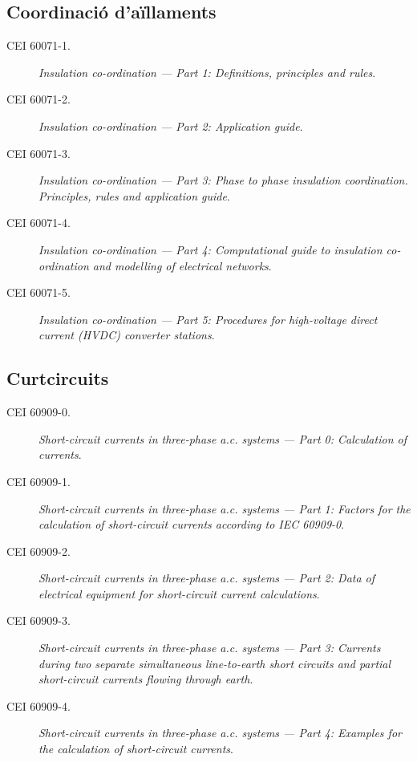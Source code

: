 \subsection*{Coordinació d'aïllaments}
\begin{description}
    \item [\hspace{5mm}CEI 60071-1.] \textit{Insulation co-ordination --- Part 1: Definitions, principles and rules}.
    \item [\hspace{5mm}CEI 60071-2.] \textit{Insulation co-ordination --- Part 2: Application guide}.
    \item [\hspace{5mm}CEI 60071-3.] \textit{Insulation co-ordination --- Part 3: Phase to phase insulation coordination. Principles, rules and application guide}.
    \item [\hspace{5mm}CEI 60071-4.] \textit{Insulation co-ordination --- Part 4: Computational guide to insulation co-ordination and modelling of electrical networks}.
    \item [\hspace{5mm}CEI 60071-5.] \textit{Insulation co-ordination --- Part 5: Procedures for high-voltage direct current (HVDC) converter stations}.
\end{description}


\subsection*{Curtcircuits}
\begin{description}
    \item [\hspace{5mm}CEI 60909-0.] \textit{Short-circuit currents in three-phase a.c. systems --- Part 0: Calculation of currents}.
    \item [\hspace{5mm}CEI 60909-1.] \textit{Short-circuit currents in three-phase a.c. systems --- Part 1:  Factors for the calculation of short-circuit currents according to IEC 60909-0}.
    \item [\hspace{5mm}CEI 60909-2.] \textit{Short-circuit currents in three-phase a.c. systems --- Part 2:  Data of electrical equipment for short-circuit current calculations}.
    \item [\hspace{5mm}CEI 60909-3.] \textit{Short-circuit currents in three-phase a.c. systems --- Part 3: Currents during two separate simultaneous line-to-earth short circuits and partial short-circuit currents flowing through earth}.
    \item [\hspace{5mm}CEI 60909-4.] \textit{Short-circuit currents in three-phase a.c. systems --- Part 4: Examples for the calculation of short-circuit currents}.
\end{description}

